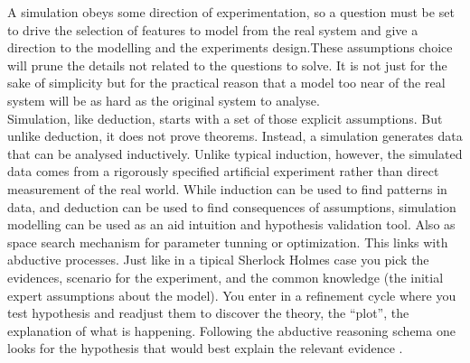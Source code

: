 \documentclass[11pt,oneside,a4paper,openright]{report}
\begin{document}
A simulation obeys some direction of experimentation, so a question must be set to drive the selection of features to model from the real system and give a direction to the modelling and the experiments design.These assumptions choice will prune the details not related to the questions to solve. It is not just for the sake of simplicity but for the practical reason that a model too near of the real system will be as hard as the original system to analyse.\\
Simulation, like deduction, starts with a set of those explicit assumptions. But unlike deduction, it does not prove theorems. Instead, a simulation generates data that can be analysed inductively. Unlike typical induction, however, the simulated data comes from a rigorously specified artificial experiment rather than direct measurement of the real world. While induction can be used to find patterns in data, and deduction can be used to find consequences of assumptions, simulation modelling can be used as an aid intuition and hypothesis validation tool. Also as space search mechanism for parameter tunning or optimization. This links with abductive processes.
Just like in a tipical Sherlock Holmes case you pick the evidences, scenario for the experiment, and the common knowledge (the initial expert assumptions about the model). You enter in a refinement cycle where you test hypothesis and readjust them to discover the theory, the ``plot'', the explanation of what is happening. Following the abductive reasoning schema one looks for the hypothesis that would best explain the relevant evidence \cite{Axelrod2003}.\\

\end{document}
